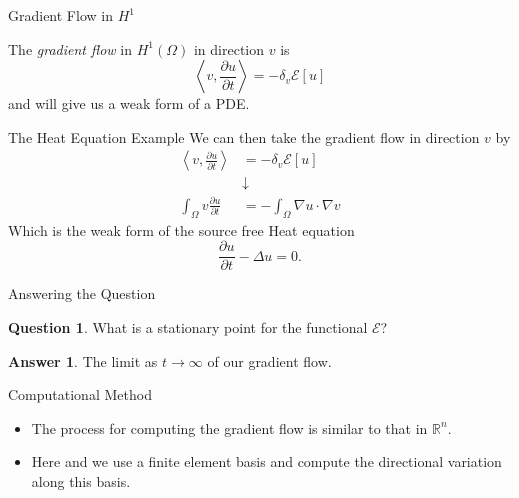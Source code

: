 \documentclass[usenames,dvipsnames]{beamer}
\theoremstyle{definition}
\newtheorem*{question}{Question}
\newtheorem*{answer}{Answer}
\theoremstyle{theorem}
\newcommand{\R}{\mathbb{R}}
\begin{document}
        
  
        
    
        \begin{frame}{Gradient Flow in $H^1$}
        \begin{definition}
            The \emph{gradient flow} in $H^1(\Omega)$ in direction $v$ is
            \[
            \left\langle v,\frac{\partial u}{\partial t}\right\rangle=-\delta_v \mathcal{E}[u]
            \]
            and will give us a weak form of a PDE.
        \end{definition}
        \end{frame}
        
        \begin{frame}{The Heat Equation Example}
            We can then take the gradient flow in direction $v$ by
            \begin{align*}
            \left\langle v,\frac{\partial u}{\partial t}\right\rangle&=-\delta_v \mathcal{E}[u]\\
            &\downarrow\\
            \int_\Omega v\frac{\partial u}{\partial t} &= -\int_\Omega \nabla u \cdot \nabla v 
            \end{align*}
            Which is the weak form of the source free Heat equation
            \[
            \frac{\partial u}{\partial t} - \Delta u = 0.
            \]
        \end{frame}
        
        
    \begin{frame}{Answering the Question}
        \begin{question}
        What is a stationary point for the functional $\mathcal{E}$?
        \end{question}
        
        \pause
        \begin{answer}
        The limit as $t\to \infty$ of our gradient flow.
        \end{answer}
    \end{frame}
    
    \begin{frame}{Computational Method}
    \begin{itemize}
        \item The process for computing the gradient flow is similar to that in $\R^n$.
        \item Here and we use a finite element basis and compute the directional variation along this basis.
    \end{itemize}
         
    \end{frame}
    
\end{document}
